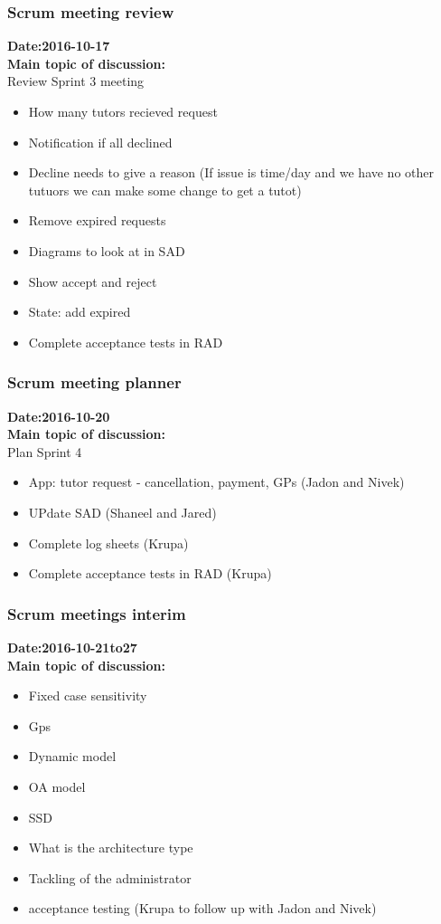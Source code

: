 \documentclass[12pt]{article}
\begin{document}
{\subsubsection{Scrum meeting review}
\textbf{Date:2016-10-17}\\
\textbf{Main topic of discussion:}\\
Review Sprint 3 meeting
\begin{itemize}
\item How many tutors recieved request
\item Notification if all declined
\item Decline needs to give a reason (If issue is time/day and we have no other tutuors we can make some change to get a tutot)
\item Remove expired requests
\item Diagrams to look at in SAD
\item Show accept and reject
\item State: add expired
\item Complete acceptance tests in RAD
\end{itemize}

\subsubsection{Scrum meeting planner}
\textbf{Date:2016-10-20}\\
\textbf{Main topic of discussion:}\\
Plan Sprint 4 
\begin{itemize}
\item App: tutor request - cancellation, payment, GPs (Jadon and Nivek)
\item UPdate SAD (Shaneel and Jared)
\item Complete log sheets (Krupa)
\item Complete acceptance tests in RAD (Krupa)
\end{itemize}

\subsubsection{Scrum meetings interim}
\textbf{Date:2016-10-21to27}\\
\textbf{Main topic of discussion:}\\
\begin{itemize}
\item Fixed case sensitivity
\item Gps 
\item Dynamic model
\item OA model
\item SSD
\item What is the architecture type
\item Tackling of the administrator
\item acceptance testing (Krupa to follow up with Jadon and Nivek)
\end{itemize}

}
\end{document}
